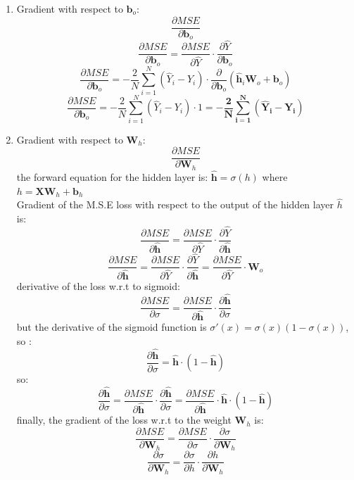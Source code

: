 \documentclass{article}
\begin{document}
\begin{enumerate}
    \item Gradient with respect to $\mathbf{b}_o$: $$\frac{\partial MSE}{\partial \mathbf{b}_o}$$
    \[
        \frac{\partial MSE}{\partial \mathbf{b}_o} = \frac{\partial MSE}{\partial \hat{Y}} \cdot \frac{\partial \hat{Y}}{\partial \mathbf{b}_o}
        \]
        \[
            \frac{\partial MSE}{\partial \mathbf{b}_o} = -\frac{2}{N} \sum_{i=1}^{N} (\hat{Y}_i - Y_i) \cdot \frac{\partial}{\partial \mathbf{b}_o} (\mathbf{\hat{h}}_i \mathbf{W}_o + \mathbf{b}_o)
            \]
            \[
                \frac{\partial MSE}{\partial \mathbf{b}_o} = -\frac{2}{N} \sum_{i=1}^{N} (\hat{Y}_i - Y_i) \cdot 1 = \mathbf{-\frac{2}{N} \sum_{i=1}^{N} (\hat{Y}_i - Y_i)}
                \]
    \item Gradient with respect to $\mathbf{W}_h$: $$\frac{\partial MSE}{\partial \mathbf{W}_h}$$
    the forward equation for the hidden layer is: $\mathbf{\hat{h}} = \sigma(h)$ where $h = \mathbf{X} \mathbf{W}_h + \mathbf{b}_h$ 
    \\ Gradient of the M.S.E loss with respect to the output of the hidden layer $\hat{h}$ is:
    \[
    \frac{\partial MSE}{\partial \mathbf{\hat{h}}} = \frac{\partial MSE}{\partial \hat{Y}} \cdot \frac{\partial \hat{Y}}{\partial \mathbf{\hat{h}}}
    \]
    \[
    \frac{\partial MSE}{\partial \mathbf{\hat{h}}} = \frac{\partial MSE}{\partial \hat{Y}} \cdot \frac{\partial \hat{Y}}{\partial \mathbf{\hat{h}}} = \frac{\partial MSE}{\partial \hat{Y}} \cdot \mathbf{W}_o
    \]
    derivative of the loss w.r.t to sigmoid:
    \[
    \frac{\partial MSE}{\partial \sigma} = \frac{\partial MSE}{\partial \mathbf{\hat{h}}} \cdot \frac{\partial \mathbf{\hat{h}}}{\partial \sigma}
    \]
    but the derivative of the sigmoid function is $\sigma'(x) = \sigma(x)(1 - \sigma(x))$, so :
    \[
        \frac{\partial \mathbf{\hat{h}}}{\partial \sigma} = \mathbf{\hat{h}} \cdot (1 - \mathbf{\hat{h}})
    \]
    so:
    \[
        \frac{\partial \mathbf{\hat{h}}}{\partial \sigma} = \frac{\partial MSE}{\partial \mathbf{\hat{h}}} \cdot \frac{\partial \mathbf{\hat{h}}}{\partial \sigma} = \frac{\partial MSE}{\partial \mathbf{\hat{h}}} \cdot \mathbf{\hat{h}} \cdot (1 - \mathbf{\hat{h}})
    \]
    finally, the gradient of the loss w.r.t to the weight $\mathbf{W}_h$ is:
    \[
    \frac{\partial MSE}{\partial \mathbf{W}_h} = \frac{\partial MSE}{\partial \sigma} \cdot \frac{\partial \sigma}{\partial \mathbf{W}_h}
    \]
    \[
    \frac{\partial \sigma}{\partial \mathbf{W}_h} = \frac{\partial \sigma}{\partial h} \cdot \frac{\partial h}{\partial \mathbf{W}_h}
    \]

\end{enumerate}
\end{document}
